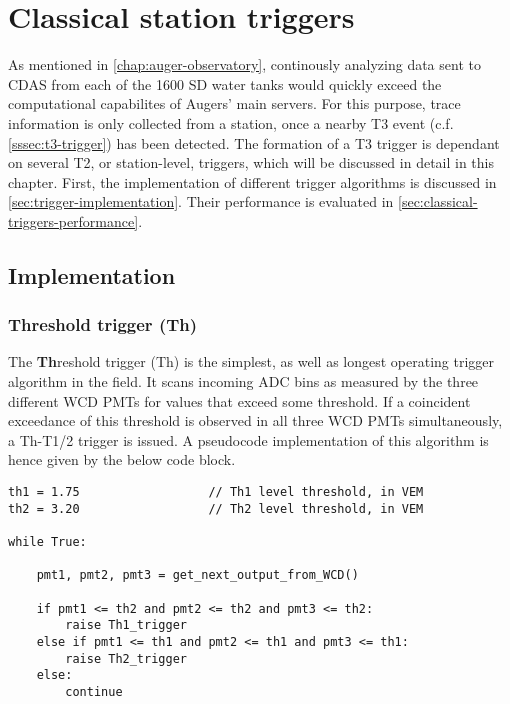 
\chapter{Classical station triggers}
\label{chap:classical-triggers}

As mentioned in \autoref{chap:auger-observatory}, continously analyzing data sent to CDAS from each of the 1600 SD water tanks would quickly exceed the 
computational capabilites of Augers' main servers. For this purpose, trace information is only collected from a station, once a nearby T3 event 
(c.f. \autoref{sssec:t3-trigger}) has been detected. The formation of a T3 trigger is dependant on several T2, or station-level, triggers, which will
be discussed in detail in this chapter. First, the implementation of different trigger algorithms is discussed in \autoref{sec:trigger-implementation}.
Their performance is evaluated in \autoref{sec:classical-triggers-performance}.

\section{Implementation}
\label{sec:classical-trigger-implementation}

\subsection{Threshold trigger (Th)}
\label{ssec:threshold-trigger}

The \textbf{Th}reshold trigger (Th) is the simplest, as well as longest operating trigger algorithm  in the field. It scans incoming ADC bins 
as measured by the three different WCD PMTs for values that exceed some threshold. If a coincident exceedance of this threshold is observed in all three 
WCD PMTs simultaneously, a Th-T1/2 trigger is issued. A pseudocode implementation of this algorithm is hence given by the below code block.

\begin{lstlisting}
th1 = 1.75                  // Th1 level threshold, in VEM   
th2 = 3.20                  // Th2 level threshold, in VEM

while True:

    pmt1, pmt2, pmt3 = get_next_output_from_WCD()

    if pmt1 <= th2 and pmt2 <= th2 and pmt3 <= th2:
        raise Th1_trigger
    else if pmt1 <= th1 and pmt2 <= th1 and pmt3 <= th1:
        raise Th2_trigger
    else: 
        continue

\end{lstlisting}

